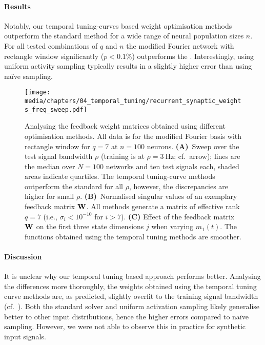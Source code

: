 \paragraph{Results}
Notably, our temporal tuning-curves based weight optimisation methods outperform the standard \NEF method for a wide range of neural population sizes $n$.
For all tested combinations of $q$ and $n$ the modified Fourier network with rectangle window significantly ($p < 0.1\%$) outperforms the \LDN.
Interestingly, using uniform activity sampling typically results in a slightly higher error than using na\"ive sampling.

\begin{figure}
	\centering
	\texttt{[image: media/chapters/04\_temporal\_tuning/recurrent\_synaptic\_weights\_freq\_sweep.pdf]}%
	{\label{fig:recurrent_synaptic_weights_freq_sweep_a}}%
	{\label{fig:recurrent_synaptic_weights_freq_sweep_b}}%
	{\label{fig:recurrent_synaptic_weights_freq_sweep_c}}%
	\caption[Analysing the feedback weight matrices obtained using different optimisation methods]{Analysing the feedback weight matrices obtained using different optimisation methods.
	All data is for the modified Fourier basis with rectangle window for $q = 7$ at $n = 100$ neurons.
	\textbf{(A)}~Sweep over the test signal bandwidth $\rho$ (training is at $\rho = \SI{3}{\hertz}$; cf.~arrow); lines are the median over $N = 100$ networks and ten test signals each, shaded areas indicate quartiles.
	The temporal tuning-curve methods outperform the standard \NEF for all $\rho$, however, the discrepancies are higher for small $\rho$.
	\textbf{(B)}~Normalised singular values of an exemplary feedback matrix $\mathbf{W}$. All methods generate a matrix of effective rank $q = 7$ (i.e., $\sigma_i < 10^{-10}$ for $i > 7$).
	\textbf{(C)} Effect of the feedback matrix $\mathbf{W}$ on the first three state dimensions $j$ when varying $m_1(t)$.
	The functions obtained using the temporal tuning methods are smoother.
	}
	\label{fig:recurrent_synaptic_weights_freq_sweep}
\end{figure}

\paragraph{Discussion}
It is unclear why our temporal tuning based approach performs better.
Analysing the differences more thoroughly, the weights obtained using the temporal tuning curve methods are, as predicted, slightly overfit to the training signal bandwidth (cf.~).
Both the standard \NEF solver and uniform activation sampling likely generalise better to other input distributions, hence the higher errors compared to na\"ive sampling.
However, we were not able to observe this in practice for synthetic input signals.

